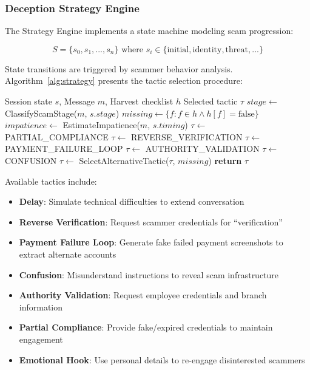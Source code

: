 \documentclass[conference]{IEEEtran}
\begin{document}
\subsubsection{Deception Strategy Engine}

The Strategy Engine implements a state machine modeling scam progression:

\begin{equation}
S = \{s_0, s_1, ..., s_n\} \text{ where } s_i \in \{\text{initial}, \text{identity}, \text{threat}, ...\}
\end{equation}

State transitions are triggered by scammer behavior analysis. Algorithm~\ref{alg:strategy} presents the tactic selection procedure:

\begin{algorithm}[H]
\caption{Deception Strategy Selection}
\label{alg:strategy}
\begin{algorithmic}[1]
\REQUIRE Session state $s$, Message $m$, Harvest checklist $h$
\ENSURE Selected tactic $\tau$
\STATE $stage \leftarrow$ ClassifyScamStage($m$, $s.stage$)
\STATE $missing \leftarrow \{f : f \in h \land h[f] = \text{false}\}$
\STATE $impatience \leftarrow$ EstimateImpatience($m$, $s.timing$)
    \STATE $\tau \leftarrow$ PARTIAL\_COMPLIANCE
    \STATE $\tau \leftarrow$ REVERSE\_VERIFICATION
    \STATE $\tau \leftarrow$ PAYMENT\_FAILURE\_LOOP
    \STATE $\tau \leftarrow$ AUTHORITY\_VALIDATION
\ELSE
    \STATE $\tau \leftarrow$ CONFUSION
\ENDIF
{}
    \STATE $\tau \leftarrow$ SelectAlternativeTactic($\tau$, $missing$)
\ENDIF
\STATE \textbf{return} $\tau$
\end{algorithmic}
\end{algorithm}

Available tactics include:
\begin{itemize}
    \item \textbf{Delay}: Simulate technical difficulties to extend conversation
    \item \textbf{Reverse Verification}: Request scammer credentials for ``verification''
    \item \textbf{Payment Failure Loop}: Generate fake failed payment screenshots to extract alternate accounts
    \item \textbf{Confusion}: Misunderstand instructions to reveal scam infrastructure
    \item \textbf{Authority Validation}: Request employee credentials and branch information
    \item \textbf{Partial Compliance}: Provide fake/expired credentials to maintain engagement
    \item \textbf{Emotional Hook}: Use personal details to re-engage disinterested scammers
\end{itemize}
\end{document}
